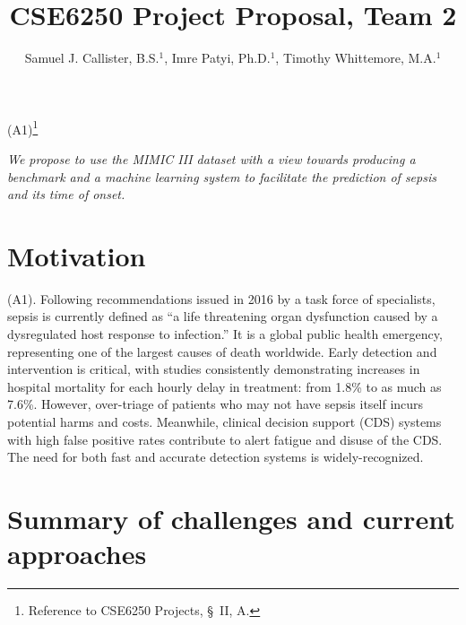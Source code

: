 \documentclass{amia}
\begin{document}
\title{CSE6250 Project Proposal, Team 2}

\author{Samuel J. Callister, B.S.$^{1}$, Imre Patyi, Ph.D.$^{1}$, Timothy Whittemore, M.A.$^{1}$}


\maketitle

 (A1)\footnote{Reference to CSE6250 Projects, \S~II, A.} 

\textit{We propose to use the MIMIC III dataset with a view towards 
	producing a benchmark and a machine learning system
	to facilitate the prediction of sepsis and its time of onset.
}


\section*{Motivation} 
	(A1).
	 Following recommendations issued in 2016 by a task force
	of specialists, sepsis is currently defined as ``a life
	threatening organ dysfunction caused by a dysregulated host
	response to infection.''\cite{singer2016}  
	 It is a global public health emergency, representing one of the largest
	causes of death worldwide.\cite{coopersmith2018}  
	 Early detection and intervention is critical, with studies
	consistently demonstrating increases in hospital mortality
	for each hourly delay in treatment: from 1.8\%\cite{liu2017}
	to as much as 7.6\%.\cite{henry2015} 
	 However, over-triage of patients who may not have sepsis 
	itself incurs potential harms and costs.\cite{liu2017,coopersmith2018}
	 Meanwhile, clinical decision support (CDS) systems with high false
	positive rates contribute to alert fatigue and disuse of
	the CDS.\cite{manaktala2016} 
	 The need for both fast and accurate detection systems is widely-recognized.
	\cite{henry2015,futoma2017,guirgis2017,horng2017,liu2017,manaktala2016,rothman2017}

\section*{Summary of challenges and current approaches}
\end{document}
